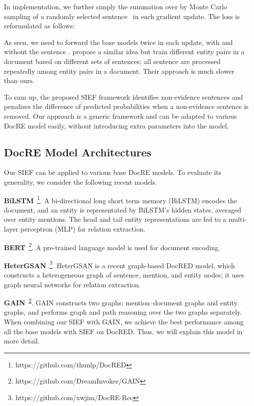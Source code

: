 \documentclass[11pt]{article}
\begin{document}
In implementation, we further simply the summation over  by Monte Carlo sampling of a randomly selected sentence~ in each gradient update.
The loss is reformulated as follows:


As seen, we need to forward the base models twice in each update, with and without the sentence . 
\citet{huang-etal-2021-three} propose a similar idea but train different entity pairs in a document based on different sets of sentences; all sentence are processed repeatedly among entity pairs in a document. Their approach is much slower than ours.

To sum up, the proposed SIEF framework identifies non-evidence sentences and penalizes the difference of predicted probabilities when a non-evidence sentence is removed. 
Our approach is a generic framework and can be adapted to various DocRE model easily, without introducing extra parameters into the model.

\subsection{DocRE Model Architectures}
\label{sec4-4}
Our SIEF can be applied to various base DocRE models.
To evaluate its generality, we consider the following recent models. 

\textbf{BiLSTM}~\cite{yao-etal-2019-docred}\footnote{https://github.com/thunlp/DocRED\label{rep_docred}}. A bi-directional long short term memory (BiLSTM) encodes the document, and an entity is representated by BiLSTM's hidden states, averaged over entity mentions. The head and tail entity representations are fed to a multi-layer perceptron (MLP) for relation extraction.

\textbf{BERT}~\cite{devlin-etal-2019-bert}\footnote{https://github.com/DreamInvoker/GAIN\label{rep_gain}}. A pre-trained language model is used for document encoding.

\textbf{HeterGSAN}~\cite{docred-rec}\footnote{https://github.com/xwjim/DocRE-Rec\label{rep_rec}}. HeterGSAN is a recent graph-based DocRED model, which constructs a heterogeneous graph of sentence, mention, and entity nodes; it uses graph neural networks for relation extraction.

\textbf{GAIN}~\cite{zeng-etal-2020-double}\textsuperscript{\ref {rep_gain}}. GAIN constructs two graphs: mention--document graphs and entity graphs, and performs graph and path reasoning over the two graphs separately. When combining our SIEF with GAIN, we achieve the best performance among all the base models with SIEF on DocRED. Thus, we will explain this model in more detail.
\end{document}
